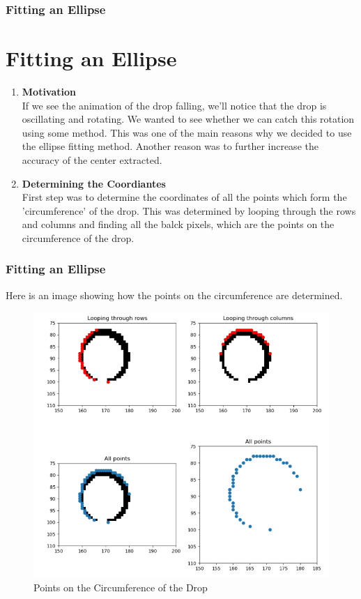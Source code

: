 \documentclass{beamer}
\begin{document}
\begin{frame}
    \frametitle{Fitting an Ellipse}
    \section{Fitting an Ellipse}
    \begin{enumerate}
        \item <1-> \textbf{Motivation}\\
              If we see the animation of the drop falling, we'll notice that the drop is oscillating and rotating. We wanted to see whether we can catch this rotation using some method. This was one of the main reasons why we decided to use the ellipse fitting method. Another reason was to further increase the accuracy of the center extracted.
        \item <2-> \textbf{Determining the Coordiantes}\\
              First step was to determine the coordinates of all the points which form the 'circumference' of the drop. This was determined by looping through the rows and columns and finding all the balck pixels, which are the points on the circumference of the drop.
    \end{enumerate}
\end{frame}
\begin{frame}
    \frametitle{Fitting an Ellipse}
    Here is an image showing how the points on the circumference are determined.\\
    \begin{figure}
        \centering
        \includegraphics[scale=0.5]{all_points.png}
        \caption[]{Points on the Circumference of the Drop}
    \end{figure}
\end{frame}
\end{document}
